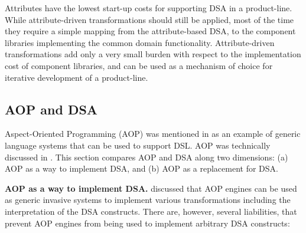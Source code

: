 Attributes have the lowest start-up costs for supporting DSA in a product-line. While attribute-driven transformations should still be applied, most of the time they require a simple mapping from the attribute-based DSA, to the component libraries implementing the common domain functionality. Attribute-driven transformations add only a very small burden with respect to the implementation cost of component libraries, and can be used as a mechanism of choice for iterative development of a product-line.

\subsection{AOP and DSA}
\label{sec.aop.dsa}

Aspect-Oriented Programming (AOP) \cite{kiczalesetal.97} was mentioned in  as an example of generic language systems that can be used to support DSL. AOP was technically discussed in . This section compares AOP and DSA along two dimensions: (a) AOP as a way to implement DSA, and (b) AOP as a replacement for DSA.

\noindent \textbf{AOP as a way to implement DSA.}  discussed that AOP engines can be used as generic invasive systems to implement various transformations including the interpretation of the DSA constructs. There are, however, several liabilities, that prevent AOP engines from being used to implement arbitrary DSA constructs:

